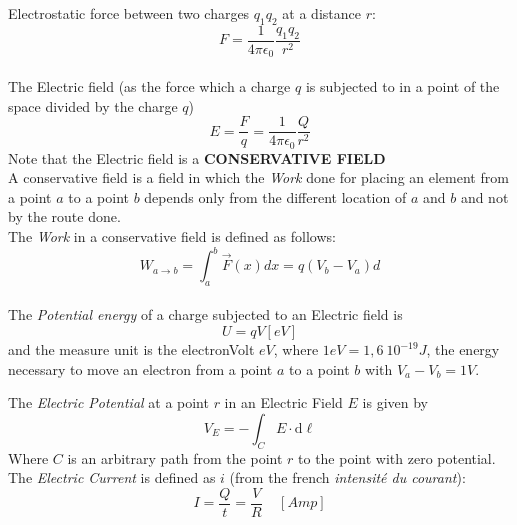 \documentclass[12pt]{article}
\newcommand{\B}{\textbf}
\newcommand{\I}{\textit}
\begin{document}
Electrostatic force between two charges $q_1 q_2$ at a distance $r$:  \begin{equation}
	F = \frac{1}{4\pi\epsilon_0}\frac{q_1q_2}{r^2}
\end{equation} \\ 
 The Electric field (as the force which a charge $q$ is subjected to in a point of the space divided by the charge $q$)
	\begin{equation}
		E = \frac{F}{q} = \frac{1}{4\pi\epsilon_0}\frac{Q}{r^2}
	\end{equation} Note that the Electric field is a \B{CONSERVATIVE FIELD}\\
	A conservative field is a field in which the \I{Work} done for placing an element from a point $a$ to a point $b$ depends only from the different location of $a$ and $b$ and not by the route done.\\

 The \I{Work} in a conservative field is defined as follows:
		\begin{equation}
			W_{a\to b} = \int_{a}^{b} \overrightarrow{F}(x)dx = q (V_b - V_a)d
		\end{equation}\\
 The \I{Potential energy} of a charge subjected to an Electric field is 
	\begin{equation}
		U = q V [eV]
	\end{equation} and the measure unit is the electronVolt $eV$, where $1 eV = 1,6 \ 10^{-19} J$, the energy necessary to move an electron from a point $a$ to a point $b$ with $V_a-V_b= 1 V$.

The \I{Electric Potential} at a point $r$ in an Electric Field $E$ is given by 
	\begin{equation}
		V_E = -\int_{C}E \cdot \mathrm{d} \boldsymbol{\ell}
	\end{equation}
	Where $C$ is an arbitrary path from the point $r$ to the point with zero potential. \\

 The \I{Electric Current} is defined as $i$ (from the french \I{intensité du courant}):
	\begin{equation}
		I = \frac{Q}{t} = \frac{V}{R} \ \ \ \ \ [Amp]
	\end{equation}
\end{document}
